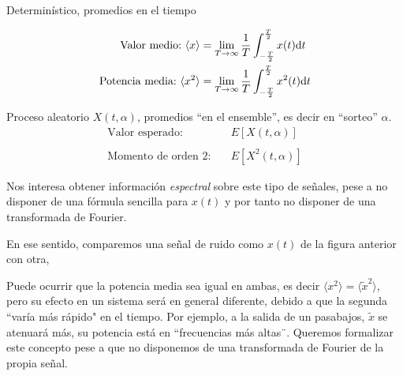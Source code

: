 \begin{minipage}[t]{0.45\textwidth}
    Determinístico, promedios en el tiempo

    \begin{align*}
        \text{Valor medio:}\  \langle x \rangle &= \lim_{T\to\infty} \frac{1}{T} \int^{\frac{T}{2}}_{-\frac{T}{2}} x(t)\mathrm{d} t\\
        \text{Potencia media:}\ \langle x^2 \rangle &= \lim_{T\to\infty} \frac{1}{T} \int^{\frac{T}{2}}_{-\frac{T}{2}} x^2(t)\mathrm{d} t
    \end{align*}
\end{minipage}
\hfil
\begin{minipage}[t]{0.45\textwidth}
    Proceso aleatorio $X(t,\alpha)$, promedios ``en el ensemble'', es decir en ``sorteo'' $\alpha$.
    \begin{align*}
        \text{Valor esperado:} &\quad E \left[X(t,\alpha)\right]\\
        \mbox{}\\
        \text{Momento de orden $2$:} &\quad E \left[X^2(t,\alpha)\right]
    \end{align*}
\end{minipage}

Nos interesa obtener información \emph{espectral} sobre este tipo
de señales, pese a no disponer de una fórmula sencilla para $x(t)$
y por tanto no disponer de una transformada de Fourier.


En ese sentido, comparemos una señal de ruido como $x(t)$ de la
figura anterior con otra, %

\begin{figure}[htb]
    \centering
\end{figure}
\FloatBarrier

 Puede ocurrir que la potencia media sea igual en
ambas, es decir $\langle x^2\rangle = \langle \tilde{x}^2
\rangle$, pero su efecto en un sistema será en general diferente,
debido a que la segunda ``varía más rápido" en el tiempo. Por
ejemplo, a la salida de un pasabajos, $\tilde{x}$ se atenuará más,
su potencia está en ``frecuencias más altas¨. Queremos formalizar
este concepto pese a que no disponemos de una transformada de
Fourier de la propia señal.

